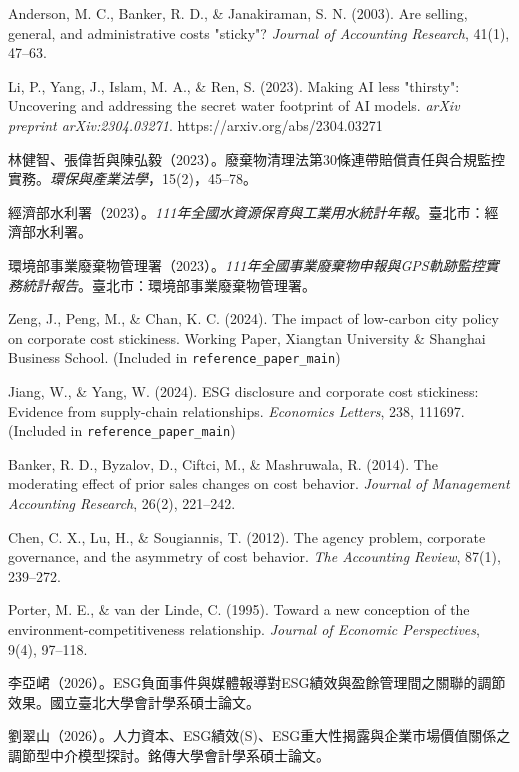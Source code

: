 \documentclass[12pt,a4paper]{article}
\begin{document}
\begin{enumerate}[label={[\arabic*]}, leftmargin=3em]
    \item Anderson, M. C., Banker, R. D., \& Janakiraman, S. N. (2003). Are selling, general, and administrative costs "sticky"? \textit{Journal of Accounting Research}, 41(1), 47--63.
    \item Li, P., Yang, J., Islam, M. A., \& Ren, S. (2023). Making AI less "thirsty": Uncovering and addressing the secret water footprint of AI models. \textit{arXiv preprint arXiv:2304.03271}. https://arxiv.org/abs/2304.03271
    \item 林健智、張偉哲與陳弘毅（2023）。廢棄物清理法第30條連帶賠償責任與合規監控實務。\textit{環保與產業法學}，15(2)，45--78。
    \item 經濟部水利署（2023）。\textit{111年全國水資源保育與工業用水統計年報}。臺北市：經濟部水利署。
    \item 環境部事業廢棄物管理署（2023）。\textit{111年全國事業廢棄物申報與GPS軌跡監控實務統計報告}。臺北市：環境部事業廢棄物管理署。
    \item Zeng, J., Peng, M., \& Chan, K. C. (2024). The impact of low-carbon city policy on corporate cost stickiness. Working Paper, Xiangtan University \& Shanghai Business School. (Included in \texttt{reference\_paper\_main})
    \item Jiang, W., \& Yang, W. (2024). ESG disclosure and corporate cost stickiness: Evidence from supply-chain relationships. \textit{Economics Letters}, 238, 111697. (Included in \texttt{reference\_paper\_main})
    \item Banker, R. D., Byzalov, D., Ciftci, M., \& Mashruwala, R. (2014). The moderating effect of prior sales changes on cost behavior. \textit{Journal of Management Accounting Research}, 26(2), 221--242.
    \item Chen, C. X., Lu, H., \& Sougiannis, T. (2012). The agency problem, corporate governance, and the asymmetry of cost behavior. \textit{The Accounting Review}, 87(1), 239--272.
    \item Porter, M. E., \& van der Linde, C. (1995). Toward a new conception of the environment-competitiveness relationship. \textit{Journal of Economic Perspectives}, 9(4), 97--118.
    \item 李亞峮（2026）。ESG負面事件與媒體報導對ESG績效與盈餘管理間之關聯的調節效果。國立臺北大學會計學系碩士論文。
    \item 劉翠山（2026）。人力資本、ESG績效(S)、ESG重大性揭露與企業市場價值關係之調節型中介模型探討。銘傳大學會計學系碩士論文。

\end{enumerate}
\end{document}
